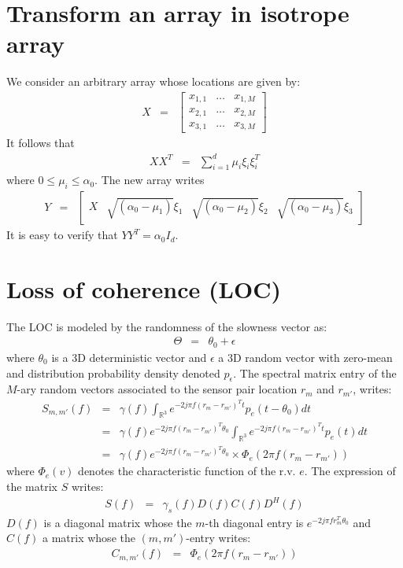 \documentclass[a4paper, 12pt]{report}
\begin{document}
\appendix
\chapter{Transform an array in isotrope array}
We consider an arbitrary  array whose locations are given by:
\begin{eqnarray*}
X&=&\begin{bmatrix}
x_{1,1}&\ldots&x_{1,M}
\\
x_{2,1}&\ldots&x_{2,M}
\\
x_{3,1}&\ldots&x_{3,M}
\end{bmatrix}
\end{eqnarray*}
It follows that
\begin{eqnarray*}
 XX^{T}&=&
 \sum_{i=1}^{d}\mu_{i}\xi_{i}\xi^{T}_{i}
\end{eqnarray*}
where $0\leq \mu_{i}\leq \alpha_{0}$. The new array writes
\begin{eqnarray*}
Y &=& \begin{bmatrix}
X&\sqrt{(\alpha_{0}-\mu_{1})}\xi_{1}&\sqrt{(\alpha_{0}-\mu_{2})}\xi_{2}&\sqrt{(\alpha_{0}-\mu_{3})}\xi_{3}
\end{bmatrix}
\end{eqnarray*}
It is easy to verify that $YY^{T}=\alpha_{0}I_{d}$.

\chapter{Loss of coherence (LOC)}
The LOC is modeled by the randomness of the slowness vector as:
\begin{eqnarray*}
\Theta &=& \theta_0+\epsilon
\end{eqnarray*}
where $\theta_0$ is a 3D deterministic vector and $\epsilon$ a 3D random vector with zero-mean and distribution probability density denoted $p_{\epsilon}$. The spectral matrix entry of the $M$-ary random vectors associated to the sensor pair location $r_{m}$ and $r_{m'}$, writes:
\begin{eqnarray*}
S_{m,m'}(f) &=& \gamma(f)\int_{\mathds{R}^3}e^{-2j\pi f (r_{m}-r_{m'})^Tt}p_{e}(t-\theta_0)dt
\\
&=&\gamma(f)
e^{-2j\pi f (r_{m}-r_{m'})^T\theta_0}
\int_{\mathds{R}^3}e^{-2j\pi f (r_{m}-r_{m'})^Tt}p_{e}(t)dt
\\
&=&\gamma(f)
e^{-2j\pi f (r_{m}-r_{m'})^T\theta_0}\times
\Phi_{e}(2\pi f(r_{m}-r_{m'}))
\end{eqnarray*}
where $\Phi_{e}(v)$ denotes the characteristic function of the r.v. $e$. The expression of the matrix $S$ writes:
\begin{eqnarray}
\label{eq:spectralmatrixwithequaldensity}
 S(f) &=& \gamma_s(f)D(f)C(f)D^H(f)
\end{eqnarray}
$D(f)$ is a diagonal matrix whose the $m$-th diagonal entry is $e^{-2j\pi f r_{m}^T\theta_0}$ and $C(f)$ a matrix whose the $(m,m')$-entry writes:
\begin{eqnarray*}
 C_{m,m'}(f) &=& \Phi_{e}(2\pi f(r_{m}-r_{m'}))
\end{eqnarray*}
\end{document}
